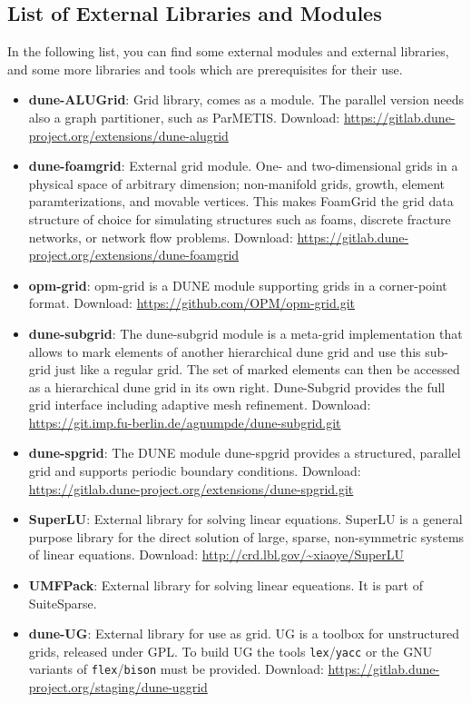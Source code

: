 \subsection{List of External Libraries and Modules}
In the following list, you can find some external modules and external libraries,
and some more libraries and tools which are prerequisites for their use.

\begin{itemize}
\item \textbf{dune-ALUGrid}: Grid library, comes as a \Dune module.
  The parallel version needs also a graph partitioner, such as {ParMETIS}.
  Download: \url{https://gitlab.dune-project.org/extensions/dune-alugrid}

\item \textbf{dune-foamgrid}: External grid module. One- and two-dimensional grids
  in a physical space of arbitrary dimension; non-manifold grids, growth, element
  paramterizations, and movable vertices. This makes FoamGrid the grid data structure
  of choice for simulating structures such as foams, discrete fracture networks,
  or network flow problems.
  Download: \url{https://gitlab.dune-project.org/extensions/dune-foamgrid}
  
\item \textbf{opm-grid}: opm-grid is a DUNE module supporting grids in a corner-point format.
  Download: \url{https://github.com/OPM/opm-grid.git}
  
\item \textbf{dune-subgrid}: The dune-subgrid module is a meta-grid implementation that allows 
to mark elements of another hierarchical dune grid and use this sub-grid just like a regular grid.
The set of marked elements can then be accessed as a hierarchical dune grid in its own right.
Dune-Subgrid provides the full grid interface including adaptive mesh refinement.
  Download: \url{https://git.imp.fu-berlin.de/agnumpde/dune-subgrid.git}
  
\item \textbf{dune-spgrid}: The DUNE module dune-spgrid provides a structured, parallel grid
and supports periodic boundary conditions.
  Download: \url{https://gitlab.dune-project.org/extensions/dune-spgrid.git}

\item \textbf{SuperLU}: External library for solving linear equations. SuperLU is a general purpose
  library for the direct solution of large, sparse, non-symmetric systems of linear equations.
  Download: \url{http://crd.lbl.gov/~xiaoye/SuperLU}

\item \textbf{UMFPack}: External library for solving linear equeations. It is part of SuiteSparse.

\item \textbf{dune-UG}: External library for use as grid. UG is a toolbox for unstructured grids, released under GPL.
  To build UG the tools \texttt{lex}/\texttt{yacc} or the GNU variants of \texttt{flex}/\texttt{bison} must be provided.
  Download: \url{https://gitlab.dune-project.org/staging/dune-uggrid}
\end{itemize}

